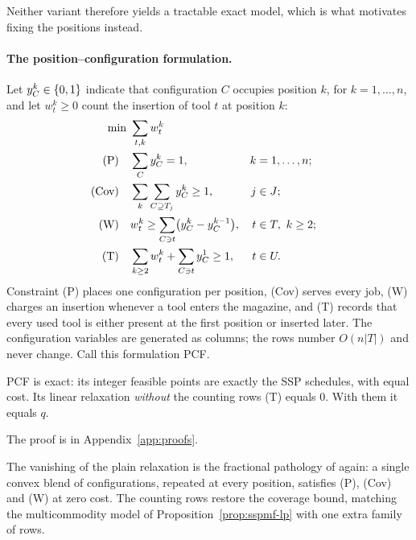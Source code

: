 Neither variant therefore yields a tractable exact model, which is what motivates
fixing the positions instead.

\paragraph{The position--configuration formulation.}
Let $y_C^{k}\in\{0,1\}$ indicate that configuration $C$ occupies position $k$, for
$k=1,\dots,n$, and let $w_t^{k}\ge0$ count the insertion of tool $t$ at position $k$:
\[
\begin{aligned}
  \min\ & \sum_{t,k} w_t^{k}\\
  \text{(P)}\quad & \sum_{C} y_C^{k}=1, & k&=1,\dots,n;\\
  \text{(Cov)}\quad & \sum_{k}\sum_{C\supseteq T_j} y_C^{k}\ge1, & j&\in J;\\
  \text{(W)}\quad & w_t^{k}\ge\sum_{C\ni t}\bigl(y_C^{k}-y_C^{k-1}\bigr), & t&\in T,\ k\ge2;\\
  \text{(T)}\quad & \sum_{k\ge2} w_t^{k}+\sum_{C\ni t} y_C^{1}\ge1, & t&\in U.
\end{aligned}
\]
Constraint (P) places one configuration per position, (Cov) serves every job, (W)
charges an insertion whenever a tool enters the magazine, and (T) records that every
used tool is either present at the first position or inserted later. The
configuration variables are generated as columns; the rows number
$O(n\lvert T\rvert)$ and never change. Call this formulation PCF.

\begin{proposition}\label{prop:pcf}
PCF is exact: its integer feasible points are exactly the SSP schedules, with equal
cost. Its linear relaxation \emph{without} the counting rows (T) equals $0$. With
them it equals $q$.
\end{proposition}

The proof is in Appendix~\ref{app:proofs}.

The vanishing of the plain relaxation is the fractional pathology of
\citet{Tang1988} again: a single convex blend of configurations, repeated at every
position, satisfies (P), (Cov) and (W) at zero cost. The counting rows restore the
coverage bound, matching the multicommodity model of
Proposition~\ref{prop:sspmf-lp} with one extra family of rows.

